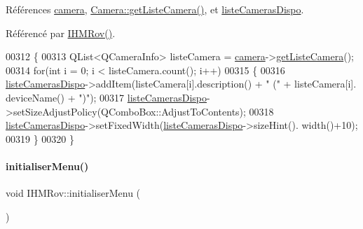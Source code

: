 Références \hyperlink{class_i_h_m_rov_a0eda0e4726269508d4563d98064dca9d}{camera}, \hyperlink{class_camera_ad8a2a21d3701375a553c7c90646c694f}{Camera\+::get\+Liste\+Camera()}, et \hyperlink{class_i_h_m_rov_a9b9e5631b8d9b6a9801a6faac8cba0f0}{liste\+Cameras\+Dispo}.



Référencé par \hyperlink{class_i_h_m_rov_a5dac1fb4612866cc61f699a415e0ef6b}{I\+H\+M\+Rov()}.


\begin{DoxyCode}
00312 \{
00313     QList<QCameraInfo> listeCamera = \hyperlink{class_i_h_m_rov_a0eda0e4726269508d4563d98064dca9d}{camera}->\hyperlink{class_camera_ad8a2a21d3701375a553c7c90646c694f}{getListeCamera}();
00314     \textcolor{keywordflow}{for}(\textcolor{keywordtype}{int} i = 0; i < listeCamera.count(); i++)
00315     \{
00316         \hyperlink{class_i_h_m_rov_a9b9e5631b8d9b6a9801a6faac8cba0f0}{listeCamerasDispo}->addItem(listeCamera[i].description() + \textcolor{stringliteral}{" ("} + listeCamera[i].
      deviceName() + \textcolor{stringliteral}{")"});
00317         \hyperlink{class_i_h_m_rov_a9b9e5631b8d9b6a9801a6faac8cba0f0}{listeCamerasDispo}->setSizeAdjustPolicy(QComboBox::AdjustToContents);
00318         \hyperlink{class_i_h_m_rov_a9b9e5631b8d9b6a9801a6faac8cba0f0}{listeCamerasDispo}->setFixedWidth(\hyperlink{class_i_h_m_rov_a9b9e5631b8d9b6a9801a6faac8cba0f0}{listeCamerasDispo}->sizeHint().
      width()+10);
00319     \}
00320 \}
\end{DoxyCode}
\mbox{\label{class_i_h_m_rov_aebbcb2325c2d1a88a012d8408e2d6223}} 
\paragraph{\texorpdfstring{initialiser\+Menu()}{initialiserMenu()}}
{\footnotesize\ttfamily void I\+H\+M\+Rov\+::initialiser\+Menu (\begin{DoxyParamCaption}{ }\end{DoxyParamCaption})\hspace{0.3cm}{\ttfamily [private]}}



